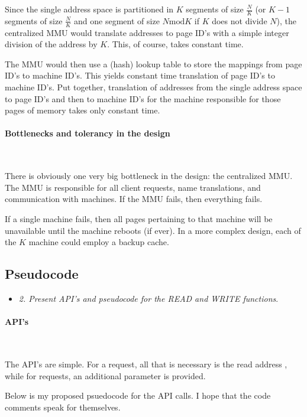 Since the single address space is partitioned in $K$ segments of size
$\frac{N}{K}$ (or $K-1$ segments of size $\frac{N}{K}$ and one segment of size
$N \text{mod} K$ if $K$ does not divide $N$), the centralized MMU would
translate addresses to page ID's with a simple integer division of the address
by $K$. This, of course, takes constant time.
\smallskip

The MMU would then use a (hash) lookup table to store the mappings from page
ID's to machine ID's. This yields constant time translation of page ID's to
machine ID's. Put together, translation of addresses from the single address
space to page ID's and then to machine ID's for the machine responsible for
those pages of memory takes only constant time.
\medskip

\paragraph{Bottlenecks and tolerancy in the design}~\smallskip

There is obviously one very big bottleneck in the design: the centralized MMU.
The MMU is responsible for all client requests, name translations, and
communication with machines. If the MMU fails, then everything fails.
\medskip

If a single machine fails, then all pages pertaining to that machine will be
unavailable until the machine reboots (if ever). In a more complex design, each
of the $K$ machine could employ a backup cache.

\streg

\subsection{Pseudocode}

\begin{itemize}
  \item \textit{2. Present API's and pseudocode for the READ and WRITE
    functions}.
\end{itemize}

\paragraph{API's}~\smallskip

The API's are simple. For a  request, all that is necessary is the read
address , while for  requests, an additional 
parameter is provided. \medskip


Below is my proposed psuedocode for the API calls. I hope that the code comments
speak for themselves.

